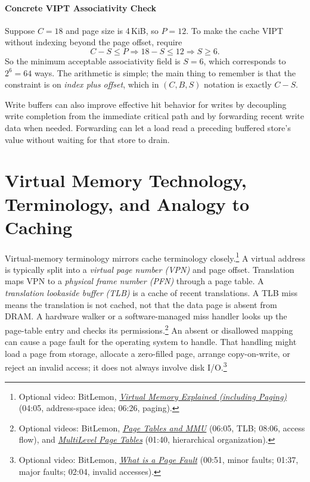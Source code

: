 \paragraph{Concrete VIPT Associativity Check}\label{par:auto-075a}
Suppose $C=18$ and page size is 4\,KiB, so $P=12$.
To make the cache VIPT without indexing beyond the page offset, require
\begin{equation}\label{eq:auto-089a}
    C-S \le P \Rightarrow 18-S \le 12 \Rightarrow S \ge 6.
\end{equation}
So the minimum acceptable associativity field is $S=6$, which corresponds to $2^6=64$ ways.
The arithmetic is simple; the main thing to remember is that the constraint is on \emph{index plus offset}, which in $(C,B,S)$ notation is exactly $C-S$.

Write buffers can also improve effective hit behavior for writes by decoupling write completion from the immediate critical path and by forwarding recent write data when needed.
Forwarding can let a load read a preceding buffered store's value without waiting for that store to drain.


\section{Virtual Memory Technology, Terminology, and Analogy to Caching}\label{sec:auto-031}
Virtual-memory terminology mirrors cache terminology closely.\footnote{Optional video: BitLemon, \href{https://youtu.be/fGP6VHxqkIM?t=245}{\emph{Virtual Memory Explained (including Paging)}} (04:05, address-space idea; 06:26, paging).}
A virtual address is typically split into a \textit{virtual page number (VPN)} and page offset.
Translation maps VPN to a \textit{physical frame number (PFN)} through a page table.
A \textit{translation lookaside buffer (TLB)} is a cache of recent translations.
A TLB miss means the translation is not cached, not that the data page is absent from DRAM.
A hardware walker or a software-managed miss handler looks up the page-table entry and checks its permissions.\footnote{Optional videos: BitLemon, \href{https://youtu.be/B6tJxvYBNrU?t=365}{\emph{Page Tables and MMU}} (06:05, TLB; 08:06, access flow), and \href{https://youtu.be/zNPVmTGt7Ds?t=100}{\emph{MultiLevel Page Tables}} (01:40, hierarchical organization).}
An absent or disallowed mapping can cause a page fault for the operating system to handle.
That handling might load a page from storage, allocate a zero-filled page, arrange copy-on-write, or reject an invalid access; it does not always involve disk I/O.\footnote{Optional video: BitLemon, \href{https://youtu.be/eoFcFqPiPjk?t=51}{\emph{What is a Page Fault}} (00:51, minor faults; 01:37, major faults; 02:04, invalid accesses).}

